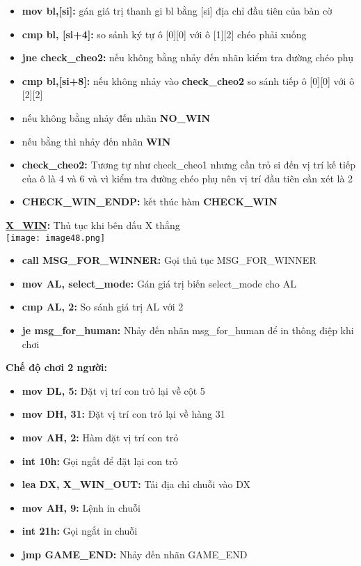 \begin{itemize}
    \item \textbf{mov bl,[si]:} gán giá trị thanh gi bl bằng [si] địa chỉ đầu tiên của bàn cờ
    \item \textbf{cmp bl, [si+4]:} so sánh ký tự ô [0][0] với ô [1][2] chéo phải xuống
    \item \textbf{jne check\_cheo2:} nếu không bằng nhảy đến nhãn kiểm tra đường chéo phụ
    \item \textbf{cmp bl,[si+8]:} nếu không nhảy vào \textbf{check\_cheo2} so sánh tiếp ô [0][0] với ô [2][2]
    \item nếu không bằng nhảy đến nhãn \textbf{NO\_WIN}
    \item nếu bằng thì nhảy đến nhãn \textbf{WIN}
    \item \textbf{check\_cheo2:} Tương tự như check\_cheo1 nhưng cần trỏ si đến vị trí kế tiếp của ô là 4 và 6 và vì kiểm tra đường chéo phụ nên vị trí đầu tiên cần xét là 2
    \item \textbf{CHECK\_WIN\_ENDP:} kết thúc hàm \textbf{CHECK\_WIN}
\end{itemize}
\textbf{\underline{X\_WIN}: }Thủ tục khi bên dấu  X thắng \\
\texttt{[image: image48.png]}
\begin{itemize}
    \item \textbf{call MSG\_FOR\_WINNER:} Gọi thủ tục MSG\_FOR\_WINNER
    \item \textbf{mov AL, select\_mode:} Gán giá trị biến select\_mode cho AL
    \item \textbf{cmp AL, 2:} So sánh giá trị AL với 2
    \item \textbf{je msg\_for\_human:} Nhảy đến nhãn msg\_for\_human để in thông điệp khi chơi 
\end{itemize}

\textbf{Chế độ chơi 2 người:}
\begin{itemize}
    \item \textbf{mov DL, 5:} Đặt vị trí con trỏ lại về cột 5 
    \item \textbf{mov DH, 31:} Đặt vị trí con trỏ lại về hàng 31
    \item \textbf{mov AH, 2:} Hàm đặt vị trí con trỏ
    \item \textbf{int 10h:} Gọi ngắt để đặt lại con trỏ
    \item \textbf{lea DX, X\_WIN\_OUT:} Tải địa chỉ chuỗi vào DX
    \item \textbf{mov AH, 9:} Lệnh in chuỗi
    \item \textbf{int 21h: }Gọi ngắt in chuỗi
    \item \textbf{jmp GAME\_END:} Nhảy đến nhãn GAME\_END
\end{itemize}


